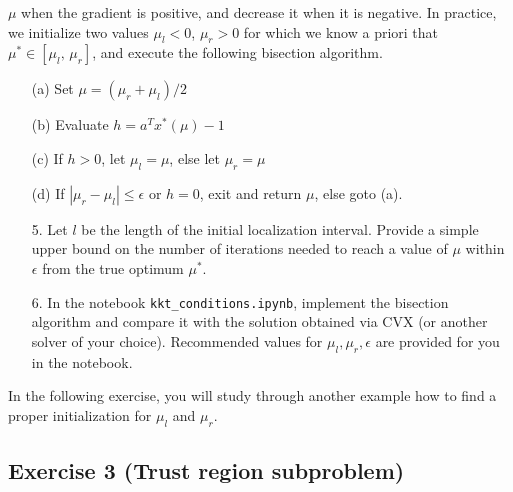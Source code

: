 \documentclass[11pt]{article}
\begin{document}
$\mu$ when the gradient is positive, and decrease it when it is negative. In practice, we initialize two values
$\mu_l< 0$, $\mu_r>0$ for which we know a priori that $\mu^*\in[\mu_l,\, \mu_r]$, and execute the following bisection algorithm.
\begin{enumerate}
\item[(a)] Set $\mu = (\mu_r + \mu_l)/2$
\item[(b)] Evaluate $h = a^T x^*(\mu)-1$
\item[(c)] If $h>0$, let $\mu_l = \mu$, else let $\mu_r = \mu$
\item[(d)] If $|\mu_r - \mu_l|\leq \epsilon$ or $h=0$, exit and return $\mu$, else goto (a).
\end{enumerate}

\begin{enumerate}
\item[5.] Let $l$ be the length of the initial localization interval. Provide a simple upper bound on the number of iterations needed to reach a value of $\mu$ within $\epsilon$ from the true optimum $\mu^*$.
\item[6.] In the notebook \verb+kkt_conditions.ipynb+, implement the bisection algorithm and compare it with the solution obtained via CVX (or another solver of your choice). Recommended values for $\mu_l, \mu_r, \epsilon$ are provided for you in the notebook. 
\end{enumerate}
In the following exercise, you will study through another example how to find a proper initialization for $\mu_l$ and $\mu_r$.

\begin{solution}
\end{solution}

\newpage
\subsection*{Exercise 3 (Trust region subproblem)}
\end{document}
